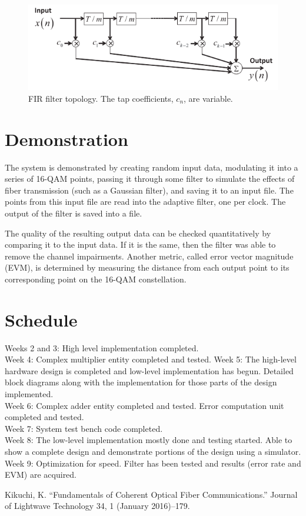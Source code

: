 \documentclass[11pt]{article}
\begin{document}
\begin{figure}
\begin{center}
\includegraphics[scale = 0.5]{fir_filter}
\caption{FIR filter topology. The tap coefficients, $c_n$, are variable.\cite{kikuchi}}
\end{center}
\end{figure}

\section{Demonstration}

The system is demonstrated by creating random input data, modulating it into a series of 16-QAM points, passing it through some filter to simulate the effects of fiber transmission (such as a Gaussian filter), and saving it to an input file. The points from this input file are read into the adaptive filter, one per clock. The output of the filter is saved into a file.

The quality of the resulting output data can be checked quantitatively by comparing it to the input data. If it is the same, then the filter was able to remove the channel impairments. Another metric, called error vector magnitude (EVM), is determined by measuring the distance from each output point to its corresponding point on the 16-QAM constellation.

\section{Schedule}

Weeks 2 and 3: High level implementation completed.\\
Week 4: Complex multiplier entity completed and tested.
Week 5: The high-level hardware design is completed and low-level implementation has begun. Detailed block diagrams along with the implementation for those parts of the design implemented.\\
Week 6: Complex adder entity completed and tested. Error computation unit completed and tested.\\
Week 7: System test bench code completed.\\
Week 8: The low-level implementation mostly done and testing started. Able to show a complete design and demonstrate portions of the design using a simulator.\\
Week 9: Optimization for speed. Filter has been tested and results (error rate and EVM) are acquired.\\

\begin{thebibliography}{20}

 Kikuchi, K. ``Fundamentals of Coherent Optical Fiber Communications.'' Journal of Lightwave Technology 34, 1 (January 2016)--179.

\end{thebibliography}
\end{document}

